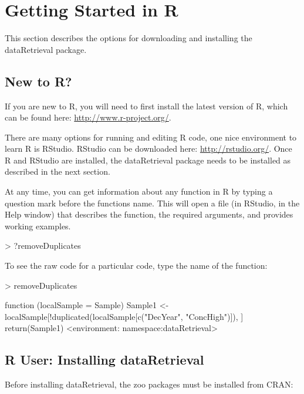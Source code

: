 \documentclass[a4paper,11pt]{article}
\begin{document}
\clearpage
\appendix
\section{Getting Started in R}
\label{sec:appendix1}
This section describes the options for downloading and installing the dataRetrieval package.

\subsection{New to R?}
If you are new to R, you will need to first install the latest version of R, which can be found here: \url{http://www.r-project.org/}.

There are many options for running and editing R code, one nice environment to learn R is RStudio. RStudio can be downloaded here: \url{http://rstudio.org/}. Once R and RStudio are installed, the dataRetrieval package needs to be installed as described in the next section.

At any time, you can get information about any function in R by typing a question mark before the functions name.  This will open a file (in RStudio, in the Help window) that describes the function, the required arguments, and provides working examples.

\begin{Schunk}
\begin{Sinput}
> ?removeDuplicates
\end{Sinput}
\end{Schunk}

To see the raw code for a particular code, type the name of the function:
\begin{Schunk}
\begin{Sinput}
> removeDuplicates
\end{Sinput}
\begin{Soutput}
function (localSample = Sample) 
{
    Sample1 <- localSample[!duplicated(localSample[c("DecYear", 
        "ConcHigh")]), ]
    return(Sample1)
}
<environment: namespace:dataRetrieval>
\end{Soutput}
\end{Schunk}


\subsection{R User: Installing dataRetrieval}
Before installing dataRetrieval, the zoo packages must be installed from CRAN:
\end{document}
